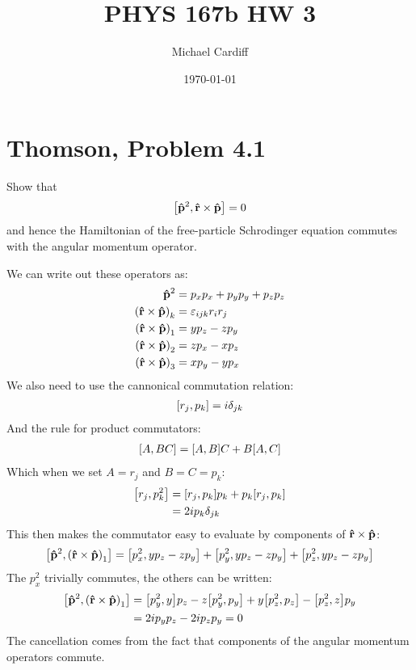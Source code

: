\documentclass[12pt]{article}
\title{\vspace{-3em}PHYS 167b HW 3}
\author{Michael Cardiff}
\date{\today}
\newcommand{\veps}{\varepsilon}
\begin{document}
\maketitle
\section{Thomson, Problem 4.1}
\begin{problem}
  Show that
  \begin{align*}
    \comm{\vu{p}^2}{\vu{r}\times\vu{p}}=0
  \end{align*}
  and hence the Hamiltonian of the free-particle Schrodinger equation commutes with the angular momentum operator.
\end{problem}
We can write out these operators as:
\begin{align*}
  \vu{p}^2&=p_x p_x+p_y p_y+p_z p_z\\
  {(\vu{r}\times\vu{p})}_k&=\veps_{ijk}r_i r_j\\
  {(\vu{r}\times\vu{p})}_1&=yp_z-zp_y\\
  {(\vu{r}\times\vu{p})}_2&=zp_x-xp_z\\
  {(\vu{r}\times\vu{p})}_3&=xp_y-yp_x
\end{align*}
We also need to use the cannonical commutation relation:
\begin{align*}
  \comm{r_j}{p_k}=i\delta_{jk}
\end{align*}
And the rule for product commutators:
\begin{align*}
  \comm{A}{BC}=\comm{A}{B}C+B\comm{A}{C}
\end{align*}
Which when we set $A=r_j$ and $B=C=p_k$:
\begin{align*}
  \comm{r_j}{p_k^2}&=\comm{r_j}{p_k}p_k+p_k\comm{r_j}{p_k}\\
  &=2ip_k\delta_{jk}
\end{align*}
This then makes the commutator easy to evaluate by components of $\vu{r}\times\vu{p}$:
\begin{align*}
  \comm{\vu{p}^2}{{(\vu{r}\times\vu{p})}_1}=
  \comm{p_x^2}{yp_z-zp_y}+\comm{p_y^2}{yp_z-zp_y}+\comm{p_z^2}{yp_z-zp_y}
\end{align*}
The $p_x^2$ trivially commutes, the others can be written:
\begin{align*}
  \comm{\vu{p}^2}{{(\vu{r}\times\vu{p})}_1}&=
  \comm{p_y^2}{y}p_z-z\comm{p_y^2}{p_y}
  +y\comm{p_z^2}{p_z}-\comm{p_z^2}{z}p_y\\
  &=2ip_y p_z-2ip_z p_y=0
\end{align*}
The cancellation comes from the fact that components of the angular momentum operators commute.
\end{document}

